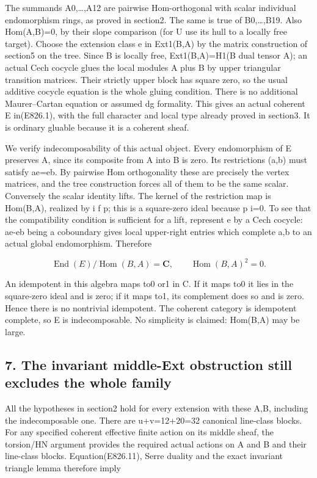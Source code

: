 The summands A0,\ldots,A12 are pairwise Hom-orthogonal with scalar
individual endomorphism rings, as proved in section2. The same is true of
B0,\ldots,B19. Also Hom(A,B)=0, by their slope comparison (for U use its
hull to a locally free target). Choose the extension class e in Ext1(B,A) by
the matrix construction of section5 on the tree. Since B is locally free,
Ext1(B,A)=H1(B dual tensor A); an actual Cech cocycle glues the local
modules A plus B by upper triangular transition matrices. Their strictly
upper block has square zero, so the usual additive cocycle equation is the
whole gluing condition. There is no additional Maurer--Cartan equation or
assumed dg formality. This gives an actual coherent E in(E826.1), with the
full character and local type already proved in section3. It is ordinary
gluable because it is a coherent sheaf.

We verify indecomposability of this actual object. Every endomorphism of E
preserves A, since its composite from A into B is zero. Its restrictions
(a,b) must satisfy ae=eb. By pairwise Hom orthogonality these are precisely
the vertex matrices, and the tree construction forces all of them to be the
same scalar. Conversely the scalar identity lifts. The kernel of the
restriction map is Hom(B,A), realized by i f p; this is a square-zero ideal
because p i=0. To see that the compatibility condition is sufficient for a
lift, represent e by a Cech cocycle: ae-eb being a coboundary gives local
upper-right entries which complete a,b to an actual global endomorphism.
Therefore

\[
 \operatorname{End}(E)/\operatorname{Hom}(B,A)=\mathbf C,
 \qquad\operatorname{Hom}(B,A)^2=0.
 \tag{E826.13}
\]

An idempotent in this algebra maps to0 or1 in C. If it maps to0 it lies in
the square-zero ideal and is zero; if it maps to1, its complement does so
and is zero. Hence there is no nontrivial idempotent. The coherent category
is idempotent complete, so E is indecomposable. No simplicity is claimed:
Hom(B,A) may be large.

\subsection{7. The invariant middle-Ext obstruction still excludes the whole
family}\label{SF-E826:the-invariant-middle-ext-obstruction-still-excludes-the-whole-family}

All the hypotheses in section2 hold for every extension with these A,B,
including the indecomposable one. There are u+v=12+20=32 canonical
line-class blocks. For any specified coherent effective finite action on its
middle sheaf, the torsion/HN argument provides the required actual actions
on A and B and their line-class blocks. Equation(E826.11), Serre duality and
the exact invariant triangle lemma therefore imply

